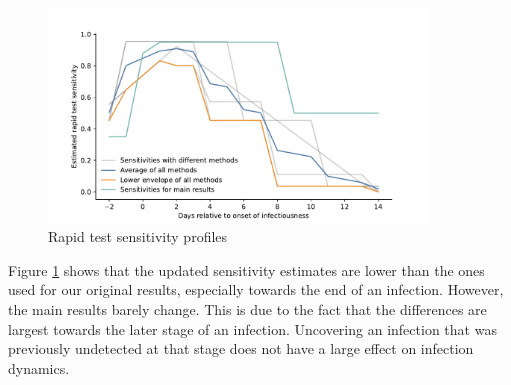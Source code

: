 {    %
    \begin{figure}
        \centering
        \includegraphics[width=0.9\textwidth]{figures/results/figures/data/testing/sensitivity_params_with_different_methods}
        \caption{Rapid test sensitivity profiles}
        \label{fig:sensitivity_assumptions}
    \end{figure}


    Figure \ref{fig:sensitivity_assumptions} shows that the updated sensitivity
    estimates are lower than the ones used for our original results, especially towards
    the end of an infection. However, the main results barely change. This is due to the
    fact that the differences are largest towards the later stage of an
    infection. Uncovering an infection that was previously undetected at that stage does
    not have a large effect on infection dynamics.

    \begin{figure}
        \centering


\end{figure}}
